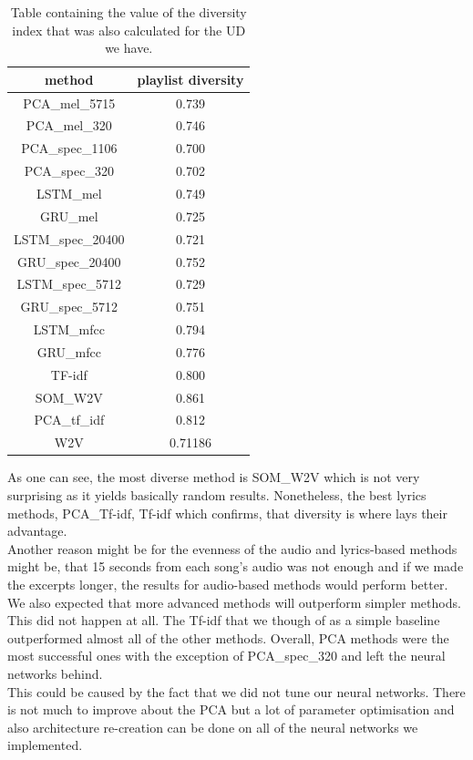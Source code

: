 \begin{table}[h]
\centering

\begin{tabu} to 1.7\textwidth {| c | c |}
\hline
\textbf{method} & \textbf{playlist diversity} \\
\hline
PCA\_mel\_5715 & 0.739 \\
\hline
PCA\_mel\_320 & 0.746 \\
\hline
PCA\_spec\_1106 & 0.700 \\
\hline
PCA\_spec\_320 & 0.702 \\
\hline
LSTM\_mel & 0.749 \\
\hline
GRU\_mel & 0.725 \\
\hline
LSTM\_spec\_20400 & 0.721 \\
\hline
GRU\_spec\_20400 &  0.752\\
\hline
LSTM\_spec\_5712 & 0.729 \\
\hline
GRU\_spec\_5712 &  0.751 \\
\hline
LSTM\_mfcc & 0.794 \\
\hline
GRU\_mfcc & 0.776 \\
\hline
TF-idf & 0.800 \\
\hline
SOM\_W2V & 0.861 \\
\hline
PCA\_tf\_idf & 0.812 \\
\hline
W2V & 0.71186 \\
\hline
\end{tabu} 
\caption{Table containing the value of the diversity index that was also calculated for the UD we have.}
\label{table:diversity_table}
\end{table}
As one can see, the most diverse method is SOM\_W2V which is not very surprising as it yields basically random results. Nonetheless, the best lyrics methods, PCA\_Tf-idf, Tf-idf which confirms, that diversity is where lays their advantage.\\
Another reason might be for the evenness of the audio and lyrics-based methods might be, that 15 seconds from each song's audio was not enough and if we made the excerpts longer, the results for audio-based methods would perform better. \\ 

We also expected that more advanced methods will outperform simpler methods. This did not happen at all. The Tf-idf that we though of as a simple baseline outperformed almost all of the other methods. Overall, PCA methods were the most successful ones with the exception of PCA\_spec\_320 and left the neural networks behind. \\
This could be caused by the fact that we did not tune our neural networks. There is not much to improve about the PCA but a lot of parameter optimisation and also architecture re-creation can be done on all of the neural networks we implemented. \\

